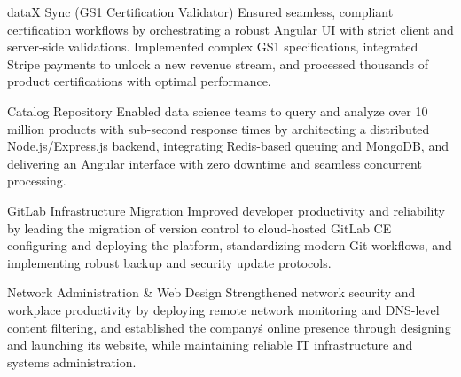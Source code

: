 \begin{sectionContainer}
	{dataX Sync (GS1 Certification Validator)} {Ensured seamless, compliant certification workflows} {by orchestrating a robust Angular UI with strict client and server-side validations. Implemented complex GS1 specifications, integrated Stripe payments to unlock a new revenue stream, and processed thousands of product certifications with optimal performance.}
\end{sectionContainer}

\begin{sectionContainer}
	{Catalog Repository} {Enabled data science teams to query and analyze over 10 million products} {with sub-second response times by architecting a distributed Node.js/Express.js backend, integrating Redis-based queuing and MongoDB, and delivering an Angular interface with zero downtime and seamless concurrent processing.}
\end{sectionContainer}

\begin{sectionContainer}
	{GitLab Infrastructure Migration} {Improved developer productivity and reliability} {by leading the migration of version control to cloud-hosted GitLab CE configuring and deploying the platform, standardizing modern Git workflows, and implementing robust backup and security update protocols.}
\end{sectionContainer}


\begin{sectionContainer}
	{Network Administration \& Web Design} {Strengthened network security and workplace productivity} {by deploying remote network monitoring and DNS-level content filtering, and established the company\'s online presence through designing and launching its website, while maintaining reliable IT infrastructure and systems administration.}
\end{sectionContainer}
\nopagebreak[4]